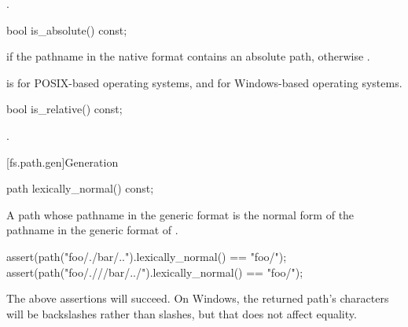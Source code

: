 \begin{itemdescr}
\pnum
\returns
{}.
\end{itemdescr}

%
\begin{itemdecl}
bool is_absolute() const;
\end{itemdecl}

\begin{itemdescr}
\pnum
\returns
{} if the pathname in the native format
  contains an absolute path, otherwise .

\pnum
\begin{example}
 is
       for  POSIX-based operating systems, and  for Windows-based
operating systems.
\end{example}
\end{itemdescr}

%
\begin{itemdecl}
bool is_relative() const;
\end{itemdecl}

\begin{itemdescr}
\pnum
\returns
{}.
\end{itemdescr}

[fs.path.gen]{Generation}

%
\begin{itemdecl}
path lexically_normal() const;
\end{itemdecl}

\begin{itemdescr}
\pnum
\returns
A path whose pathname in the generic format is
the normal form of the pathname
in the generic format of .

\pnum
\begin{example}
\begin{codeblock}
assert(path("foo/./bar/..").lexically_normal() == "foo/");
assert(path("foo/.///bar/../").lexically_normal() == "foo/");
\end{codeblock}
The above assertions will succeed.
On Windows, the returned path's  characters
will be backslashes rather than slashes,
but that does not affect  equality.
\end{example}
\end{itemdescr}

